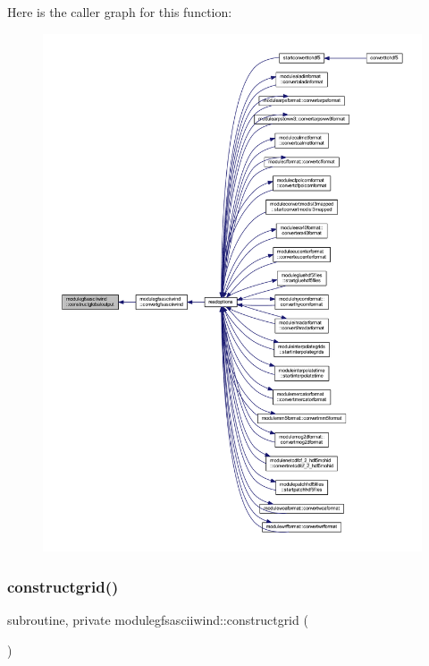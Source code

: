 Here is the caller graph for this function\+:\nopagebreak
\begin{figure}[H]
\begin{center}
\leavevmode
\includegraphics[width=350pt]{namespacemodulegfsasciiwind_a138e1d55d83fe4bc5ba1901ae3adcbb7_icgraph}
\end{center}
\end{figure}
\mbox{\label{namespacemodulegfsasciiwind_a794951032db573702ba8cfba3fe3f55b}} 
\subsubsection{\texorpdfstring{constructgrid()}{constructgrid()}}
{\footnotesize\ttfamily subroutine, private modulegfsasciiwind\+::constructgrid (\begin{DoxyParamCaption}{ }\end{DoxyParamCaption})\hspace{0.3cm}{\ttfamily [private]}}

